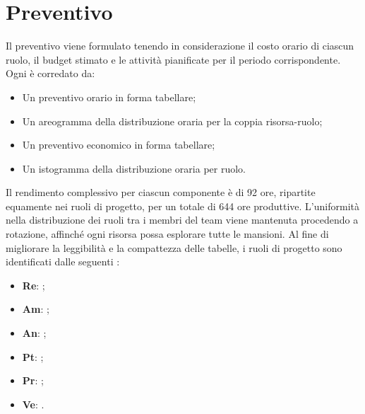 \section{Preventivo}
\label{sec:preventivo}

\par Il preventivo viene formulato tenendo in considerazione il costo orario di ciascun ruolo, il budget stimato e le attività pianificate per il periodo corrispondente. Ogni  è corredato da:
\begin{itemize}
    \item Un preventivo orario in forma tabellare;
    \item Un areogramma della distribuzione oraria per la coppia risorsa-ruolo;
    \item Un preventivo economico in forma tabellare;
    \item Un istogramma della distribuzione oraria per ruolo.
\end{itemize}

\vspace{0.5\baselineskip}
\par Il rendimento complessivo per ciascun componente è di 92 ore, ripartite equamente nei ruoli di progetto, per un totale di 644 ore produttive. L'uniformità nella distribuzione dei ruoli tra i membri del team viene mantenuta procedendo a rotazione, affinché ogni risorsa possa esplorare tutte le mansioni. Al fine di migliorare la leggibilità e la compattezza delle tabelle, i ruoli di progetto sono identificati dalle seguenti :
\begin{itemize}
    \item \textbf{Re}: \Responsabile[U];
    \item \textbf{Am}: \Amministratore[U];
    \item \textbf{An}: \Analista[U];
    \item \textbf{Pt}: \Progettista[U];
    \item \textbf{Pr}: \Programmatore[U];
    \item \textbf{Ve}: \Verificatore[U].
\end{itemize}











